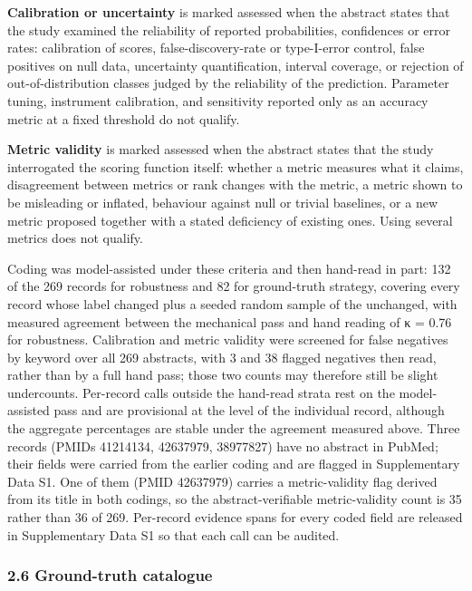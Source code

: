 \documentclass[11pt]{article}
\begin{document}
\textbf{Calibration or uncertainty} is marked assessed when the abstract
states that the study examined the reliability of reported
probabilities, confidences or error rates: calibration of scores,
false-discovery-rate or type-I-error control, false positives on null
data, uncertainty quantification, interval coverage, or rejection of
out-of-distribution classes judged by the reliability of the prediction.
Parameter tuning, instrument calibration, and sensitivity reported only
as an accuracy metric at a fixed threshold do not qualify.

\textbf{Metric validity} is marked assessed when the abstract states
that the study interrogated the scoring function itself: whether a
metric measures what it claims, disagreement between metrics or rank
changes with the metric, a metric shown to be misleading or inflated,
behaviour against null or trivial baselines, or a new metric proposed
together with a stated deficiency of existing ones. Using several
metrics does not qualify.

Coding was model-assisted under these criteria and then hand-read in
part: 132 of the 269 records for robustness and 82 for ground-truth
strategy, covering every record whose label changed plus a seeded random
sample of the unchanged, with measured agreement between the mechanical
pass and hand reading of κ = 0.76 for robustness. Calibration and metric
validity were screened for false negatives by keyword over all 269
abstracts, with 3 and 38 flagged negatives then read, rather than by a
full hand pass; those two counts may therefore still be slight
undercounts. Per-record calls outside the hand-read strata rest on the
model-assisted pass and are provisional at the level of the individual
record, although the aggregate percentages are stable under the
agreement measured above. Three records (PMIDs 41214134, 42637979,
38977827) have no abstract in PubMed; their fields were carried from the
earlier coding and are flagged in Supplementary Data S1. One of them
(PMID 42637979) carries a metric-validity flag derived from its title in
both codings, so the abstract-verifiable metric-validity count is 35
rather than 36 of 269. Per-record evidence spans for every coded field
are released in Supplementary Data S1 so that each call can be audited.

\subsubsection{2.6 Ground-truth catalogue}\label{ground-truth-catalogue}
\end{document}
